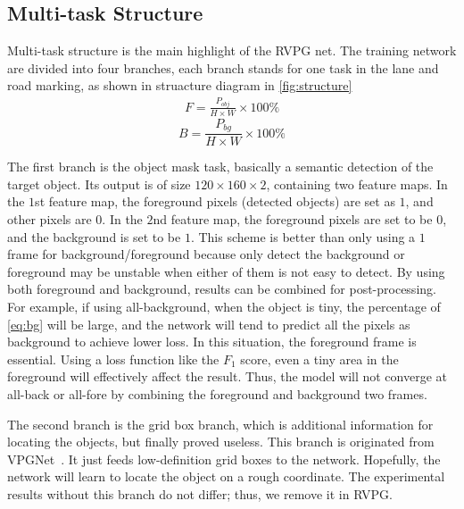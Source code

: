 \begin{spacing}{1.5}
\subsection{Multi-task Structure}
\label{subsec:multitask}

Multi-task structure is the main highlight of the RVPG net. The training network are divided into four branches, each branch stands for one task in the lane and road marking, as shown in struacture diagram in \autoref{fig:structure}
\begin{align}
    F = \frac{P_{obj}}{H \times W} \times 100\% \label{eq:fore}
\end{align}
\vspace{-7mm}
\begin{equation}
    B = \frac{P_{bg}}{H \times W} \times 100\% \label{eq:bg}
\end{equation}

The first branch is the object mask task, basically a semantic detection of the target object. Its output is of size $120 \times 160 \times 2$, containing two feature maps. In the $1$st feature map, the foreground pixels (detected objects) are set as $1$, and other pixels are $0$. In the $2$nd feature map, the foreground pixels are set to be $0$, and the background is set to be $1$. This scheme is better than only using a $1$ frame for background/foreground because only detect the background or foreground may be unstable when either of them is not easy to detect. By using both foreground and background, results can be combined for post-processing. For example, if using all-background, when the object is tiny, the percentage of \autoref{eq:bg} will be large, and the network will tend to predict all the pixels as background to achieve lower loss. In this situation, the foreground frame is essential. Using a loss function like the $F_1$ score, even a tiny area in the foreground will effectively affect the result. Thus, the model will not converge at all-back or all-fore by combining the foreground and background two frames.

The second branch is the grid box branch, which is additional information for locating the objects, but finally proved useless. This branch is originated from VPGNet~\cite{lee2017vpgnet}. It just feeds low-definition grid boxes to the network. Hopefully, the network will learn to locate the object on a rough coordinate. The experimental results without this branch do not differ; thus, we remove it in RVPG.


\end{spacing}
